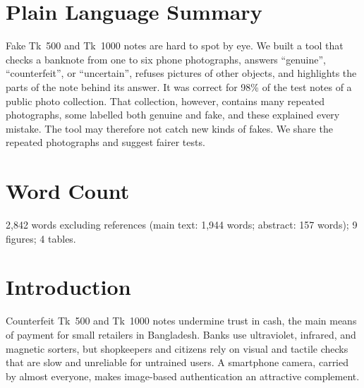 \documentclass[pdflatex,iicol,sn-mathphys-num]{sn-jnl}
\begin{document}
\section*{Plain Language Summary}
Fake Tk~500 and Tk~1000 notes are hard to spot by eye. We built a tool that checks a
banknote from one to six phone photographs, answers ``genuine'', ``counterfeit'', or
``uncertain'', refuses pictures of other objects, and highlights the parts of the note
behind its answer. It was correct for 98\% of the test notes of a public photo
collection. That collection, however, contains many repeated photographs, some labelled
both genuine and fake, and these explained every mistake. The tool may therefore not
catch new kinds of fakes. We share the repeated photographs and suggest fairer tests.

\section*{Word Count}
2{,}842 words excluding references (main text: 1{,}944 words; abstract: 157 words);
9 figures; 4 tables.

\section{Introduction}\label{sec:intro}

Counterfeit Tk~500 and Tk~1000 notes undermine trust in cash, the main means of payment
for small retailers in Bangladesh. Banks use ultraviolet, infrared, and magnetic sorters,
but shopkeepers and citizens rely on visual and tactile checks that are slow and
unreliable for untrained users. A smartphone camera, carried by almost everyone, makes
image-based authentication an attractive complement.
\end{document}

